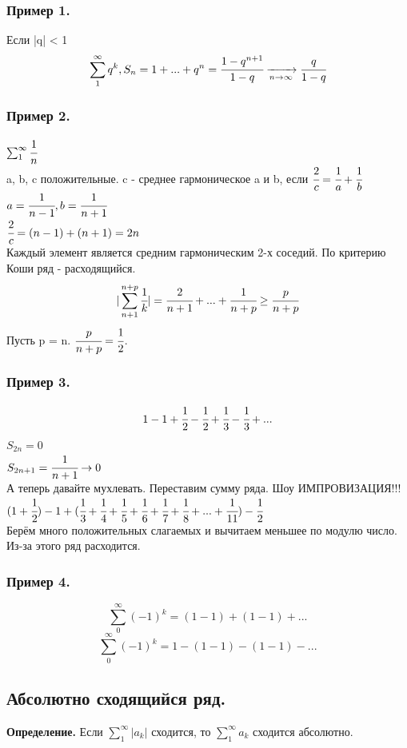 \documentclass[12pt, a4paper]{article}
\begin{document}
\subsubsection*{Пример 1.}
Если |q| < 1
\[ \sum_1^\infty q^k, S_n = 1+...+q^n = \cfrac{1-q^{n+1}}{1-q} \xrightarrow[n\to\infty]{} \cfrac{q}{1-q} \]
\subsubsection*{Пример 2.}
$\sum_1^\infty \cfrac{1}{n}$\\
a, b, c положительные. c - среднее гармоническое a и b, если $\cfrac{2}{c} = \cfrac{1}{a} + \cfrac{1}{b}$\\
$a = \cfrac{1}{n-1}, b = \cfrac{1}{n+1}$\\
$\cfrac{2}{c} = (n - 1) + (n + 1) = 2n$\\
Каждый элемент является средним гармоническим 2-х соседий. По критерию Коши ряд - расходящийся.
\[ |\sum_{n+1}^{n+p} \cfrac{1}{k}| = \cfrac{2}{n+1} + ... + \cfrac{1}{n+p} \geq \cfrac{p}{n+p}\]
Пусть p = n. $\cfrac{p}{n+p} = \cfrac{1}{2}$.
\subsubsection*{\textbf{Пример 3.}}
\[ 1 - 1 + \cfrac{1}{2} - \cfrac{1}{2} + \cfrac{1}{3} - \cfrac{1}{3} + ...\]
$S_{2n} = 0$\\
$S_{2n+1} = \cfrac{1}{n+1} \to 0$\\
А теперь давайте мухлевать. Переставим сумму ряда. Шоу ИМПРОВИЗАЦИЯ!!!\\
$(1+\cfrac{1}{2}) - 1 + (\cfrac{1}{3} + \cfrac{1}{4} +\cfrac{1}{5} + \cfrac{1}{6} + \cfrac{1}{7} + \cfrac{1}{8} + ... + \cfrac{1}{11}) - \cfrac{1}{2}$\\
Берём много положительных слагаемых и вычитаем меньшее по модулю число. Из-за этого ряд расходится.
\subsubsection*{\textbf{Пример 4.}}
\[ \sum^\infty_{0} (-1)^k = (1-1) + (1-1) + ... \]
\[ \sum^\infty_{0} (-1)^k = 1 - (1-1) - (1-1) - ... \]

\subsection{Абсолютно сходящийся ряд.}
\begin{tcolorbox}
    \textbf{Определение.} Если $\sum^\infty_{1} |a_k|$ сходится, то $\sum^\infty_{1} a_k$ сходится абсолютно.
\end{tcolorbox}
\end{document}
